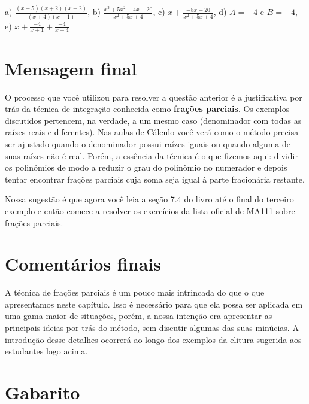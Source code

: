 \documentclass[main_estudante.tex]{subfiles}
\begin{document}

\begin{gabarito}
	\begin{gabaritoQuestao}
		a) $\frac{(x+5)(x+2)(x-2)}{(x+4)(x+1)}$, b) $\frac{x^3+5x^2-4x-20}{x^2+5x+4}$, c) $x+\frac{-8x-20}{x^2+5x+4}$, d) $A=-4$ e $B=-4$, e) $x+\frac{-4}{x+1}+\frac{-4}{x+4}$
	\end{gabaritoQuestao}
\end{gabarito}

\section{Mensagem final}

O processo que você utilizou para resolver a questão anterior é a justificativa por trás da técnica de integração conhecida como \textbf{frações parciais}. Os exemplos discutidos pertencem, na verdade, a um mesmo caso (denominador com todas as raízes reais e diferentes). Nas aulas de Cálculo você verá como o método precisa ser ajustado quando o denominador possui raízes iguais ou quando alguma de suas raízes não é real. Porém, a essência da técnica é o que fizemos aqui: dividir os polinômios de modo a reduzir o grau do polinômio no numerador e depois tentar encontrar frações parciais cuja soma seja igual à parte fracionária restante.

Nossa sugestão é que agora você leia a seção 7.4 do livro  até o final do terceiro exemplo e então comece a resolver os exercícios da lista oficial de MA111 sobre frações parciais.

\paraTutores

\section{Comentários finais}

A técnica de frações parciais é um pouco mais intrincada do que o que apresentamos neste capítulo. Isso é necessário para que ela possa ser aplicada em uma gama maior de situações, porém, a nossa intenção era apresentar as principais ideias por trás do método, sem discutir algumas das suas minúcias. A introdução desse detalhes ocorrerá ao longo dos exemplos da elitura sugerida aos estudantes logo acima.

\newpage

\section{Gabarito}

\imprimeGabarito

\paraAmbos
\end{document}
